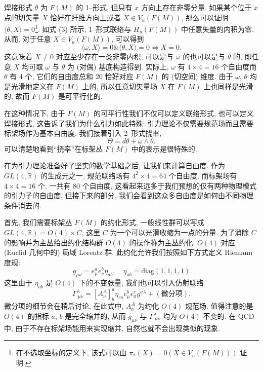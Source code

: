 \documentclass{article}
\begin{document}
焊接形式 $\theta$ 为 $F(M)$ 的 1--形式, 但只有 $x$ 方向上存在非零分量. 如果某个位于 $x$ 点的切矢量 $X$ 恰好在纤维方向上或者 $X\in V_{u}(F(M))$, 那么可以证明 $\langle\theta,X\rangle=0$\footnote{在不选取坐标的定义下, 该式可以由 $\pi_{*}(X)=0(X\in V_{u}(F(M)))$ 证明.}. 如式 (3) 所示, 1--形式联络与 $H_{u}(F(M))$ 中任意矢量的内积为零. 从而, 对于任意 $X\in V_{u}(F(M))$, 可以得到
\begin{equation}
\langle\omega, X\rangle=0\&\langle \theta, X\rangle=0\Leftrightarrow X=0.
\end{equation}
这意味着 $X\neq 0$ 对应至少存在一类非零内积, 可以是与 $\omega$ 的也可以是与 $\theta$ 的, 即任意 $X$ 均可取 $\omega$ 与 $\theta$ 为 (对偶) 基底构造得到. 实际上, $\omega$ 有 $4\times4=16$ 个自由度而 $\theta$ 有 4 个, 它们的自由度总和 20 恰好对应 $F(M)$ 的 (切空间) 维度. 由于 $\omega$, $\theta$ 均是光滑地定义在 $F(M)$ 上的, 所以任意切矢量场 $X$ 在 $F(M)$ 上也同样是光滑的, 故而 $F(M)$ 是可平行化的.

在这种情况下, 由于 $F(M)$ 的可平行性我们不仅可以定义联络形式, 也可以定义焊接形式, 这告诉了我们为什么引力如此特殊: 引力理论不仅需要规范场而且需要标架场作为基本自由度. 我们接着引入 2--形式挠率,
\begin{equation}
\Theta=d\theta+\omega\wedge \theta.
\end{equation}
可以清楚地看到``挠率''在标架丛 $F(M)$ 中的表示是很特殊的.

在为引力理论准备好了坚实的数学基础之后, 让我们来计算自由度. 作为 $GL(4,\mathbb{R})$ 的生成元之一, 规范联络场有 $4^{2}\times4=64$ 个自由度, 而标架场有 $4\times4=16$ 个. 一共有 80 个自由度, 这看起来远多于我们预想的仅有两种物理模式的引力子的自由度, 但接下来的部分, 我们会看到这众多自由度是如何由不同物理条件消去的.

首先, 我们需要标架丛 $F(M)$ 的约化形式, 一般线性群可以写成  $GL(4,\mathbb{R})=O(4)\times C$, 这里 $C$ 为一个可以光滑收缩为一点的分量. 为了消除 $C$ 的影响并为主丛给出约化结构群 $O(4)$ 的操作称为主丛约化. $O(4)$ 对应 (Euclid 几何中的) 局域 Lorentz 群. 此约化允许我们按照如下方式定义 Riemann 度规:
\begin{equation}
g_{\mu\nu}=e_{\mu}^{a}e^{b}_{\nu}\eta_{ab}, \quad\eta_{ab}=\textrm{diag}(1,1,1,1)
\end{equation}
这里由于 $\eta_{ab}$ 是 $O(4)$ 下的不变张量, 我们也可以引入仿射联络
\begin{equation}
\Gamma_{\ \mu\nu}^{\lambda}=[A_{\nu}^{A}]_{b}^{a}\eta_{ca}e_{\mu}^{b}e_{\sigma}^{c}g^{\sigma\lambda}+(\textrm{微分项}).
\end{equation}
微分项的细节会在稍后讨论, 在此式中, $A_{\nu}^{A}$ 为约化 $O(4)$ 规范场. 值得注意的是 $O(4)$ 的指标 $a$, $b$ 是完全缩并的, 从而 $g_{\mu\nu}$ 与 $\Gamma_{\ \mu\nu}^{\lambda}$ 均为 $O(4)$ 不变的. 在 QCD 中, 由于不存在标架场能用来实现缩并, 自然也就不会出现类似的现象.
\end{document}
